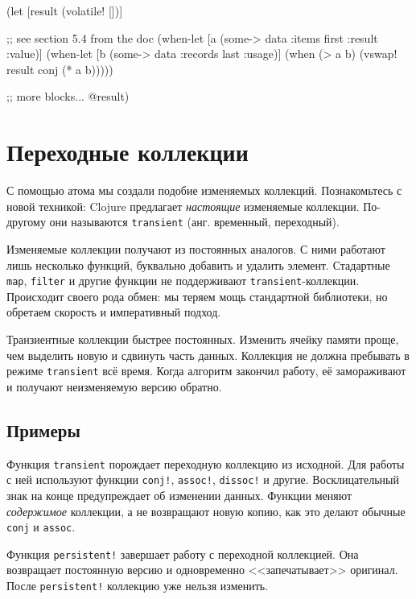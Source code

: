 \begin{english}
  \begin{clojure}
(let [result (volatile! [])]

  ;; see section 5.4 from the doc
  (when-let [a (some-> data :items first :result :value)]
    (when-let [b (some-> data :records last :usage)]
      (when (> a b)
        (vswap! result conj (* a b)))))

  ;; more blocks...
  @result)
  \end{clojure}
\end{english}

\section{Переходные коллекции}


С помощью атома мы создали подобие изменяемых коллекций. Познакомьтесь с новой
техникой: Clojure предлагает \emph{настоящие} изменяемые коллекции. По-другому
они называются \verb|transient| (анг. временный, переходный).

Изменяемые коллекции получают из постоянных аналогов. С ними работают лишь
несколько функций, буквально добавить и удалить элемент. Стадартные
\verb|map|, \verb|filter| и другие функции не поддерживают
\verb|transient|-коллекции. Происходит своего рода обмен: мы теряем мощь
стандартной библиотеки, но обретаем скорость и императивный подход.

Транзиентные коллекции быстрее постоянных. Изменить ячейку памяти проще, чем
выделить новую и сдвинуть часть данных. Коллекция не должна пребывать в режиме
\verb|transient| всё время. Когда алгоритм закончил работу, её
замораживают и получают неизменяемую версию обратно.

\subsection{Примеры}

Функция \verb|transient| порождает переходную коллекцию из исходной. Для
работы с ней используют функции \verb|conj!|, \verb|assoc!|,
\verb|dissoc!| и другие. Восклицательный знак на конце предупреждает об
изменении данных. Функции меняют \emph{содержимое} коллекции, а не возвращают
новую копию, как это делают обычные \verb|conj| и \verb|assoc|.


Функция \verb|persistent!| завершает работу с переходной коллекцией. Она
возвращает постоянную версию и одновременно <<запечатывает>> оригинал. После
\verb|persistent!| коллекцию уже нельзя изменить.

